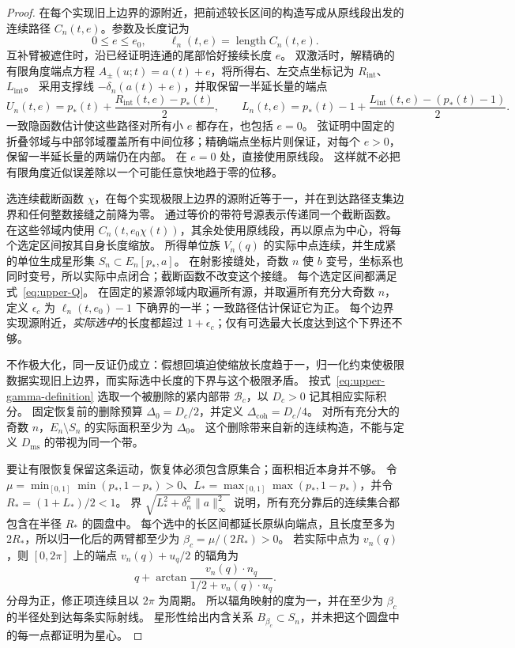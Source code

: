 \begin{proof}
在每个实现旧上边界的源附近，把前述较长区间的构造写成从原线段出发的连续路径 $C_n(t,e)$。参数及长度记为
\[
 0\le e\le e_0,\qquad \ell_n(t,e)=\operatorname{length}C_n(t,e).
\]
互补臂被遮住时，沿已经证明连通的尾部恰好接续长度 $e$。
双激活时，解精确的有限角度端点方程 $A_\pm(u;t)=a(t)+e$，将所得右、左交点坐标记为 $R_{\mathrm{int}}$、$L_{\mathrm{int}}$。
采用支撑线 $-\delta_n(a(t)+e)$，并取保留一半延长量的端点
\[
 U_n(t,e)=p_*(t)+\frac{R_{\mathrm{int}}(t,e)-p_*(t)}2,\qquad
 L_n(t,e)=p_*(t)-1+
                  \frac{L_{\mathrm{int}}(t,e)-(p_*(t)-1)}2.
\]
一致隐函数估计使这些路径对所有小 $e$ 都存在，也包括 $e=0$。
弦证明中固定的折叠邻域与中部邻域覆盖所有中间位移；精确端点坐标片则保证，对每个 $e>0$，保留一半延长量的两端仍在内部。
在 $e=0$ 处，直接使用原线段。
这样就不必把有限角度近似误差除以一个可能任意快地趋于零的位移。

选连续截断函数 $\chi$，在每个实现极限上边界的源附近等于一，并在到达路径支集边界和任何整数接缝之前降为零。
通过等价的带符号源表示传递同一个截断函数。
在这些邻域内使用 $C_n(t,e_0\chi(t))$，其余处使用原线段，再以原点为中心，将每个选定区间按其自身长度缩放。
所得单位族 $V_n(q)$ 的实际中点连续，并生成紧的单位生成星形集 $S_n\subset E_n[p_*,a]$。
在射影接缝处，奇数 $n$ 使 $b$ 变号，坐标系也同时变号，所以实际中点闭合；截断函数不改变这个接缝。
每个选定区间都满足式~\eqref{eq:upper-Q}。
在固定的紧源邻域内取遍所有源，并取遍所有充分大奇数 $n$，定义 $\epsilon_c$ 为 $\ell_n(t,e_0)-1$ 下确界的一半；一致路径估计保证它为正。
每个边界实现源附近，\emph{实际选中}的长度都超过 $1+\epsilon_c$；仅有可选最大长度达到这个下界还不够。

不作极大化，同一反证仍成立：假想回填迫使缩放长度趋于一，归一化约束使极限数据实现旧上边界，而实际选中长度的下界与这个极限矛盾。
按式~\eqref{eq:upper-gamma-definition} 选取一个被删除的紧内部带 $\mathcal B_c$，以 $D_c>0$ 记其相应实际积分。
固定恢复前的删除预算 $\Delta_0=D_c/2$，并定义 $\Delta_{\mathrm{coh}}=D_c/4$。
对所有充分大的奇数 $n$，$E_n\setminus S_n$ 的实际面积至少为 $\Delta_0$。
这个删除带来自新的连续构造，不能与定义 $D_{\mathrm{ms}}$ 的带视为同一个带。

要让有限恢复保留这条运动，恢复体必须包含原集合；面积相近本身并不够。
令 $\mu=\min_{[0,1]}\min(p_*,1-p_*)>0$、$L_*=\max_{[0,1]}\max(p_*,1-p_*)$，并令 $R_*=(1+L_*)/2<1$。
界 $\sqrt{L_*^2+\delta_n^2\|a\|_\infty^2}$ 说明，所有充分靠后的连续集合都包含在半径 $R_*$ 的圆盘中。
每个选中的长区间都延长原纵向端点，且长度至多为 $2R_*$，所以归一化后的两臂都至少为 $\beta_c=\mu/(2R_*)>0$。
若实际中点为 $v_n(q)$，则 $[0,2\pi]$ 上的端点 $v_n(q)+u_q/2$ 的辐角为
\[
 q+\arctan\frac{v_n(q)\cdot n_q}{1/2+v_n(q)\cdot u_q}.
\]
分母为正，修正项连续且以 $2\pi$ 为周期。
所以辐角映射的度为一，并在至少为 $\beta_c$ 的半径处到达每条实际射线。
星形性给出内含关系 $B_{\beta_c}\subset S_n$，并未把这个圆盘中的每一点都证明为星心。


\end{proof}

